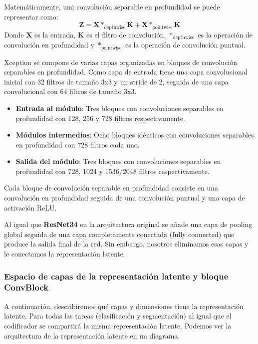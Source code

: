 Matemáticamente, una convolución separable en profundidad se puede representar como:
\[
\mathbf{Z} = \mathbf{X} *_{\text{depthwise}} \mathbf{K} + \mathbf{X} *_{\text{pointwise}} \mathbf{K}
\]
Donde \(\mathbf{X}\) es la entrada, \(\mathbf{K}\) es el filtro de convolución, \(*_{\text{depthwise}}\) es la operación de convolución en profundidad y \(*_{\text{pointwise}}\) es la operación de convolución puntual.


Xception se compone de varias capas organizadas en bloques de convolución separables en profundidad. Como capa de entrada tiene una capa convolucional inicial con 32 filtros de tamaño 3x3 y un stride de 2, seguida de una capa convolucional con 64 filtros de tamaño 3x3.

\begin{itemize}
	\item \textbf{Entrada al módulo}: Tres bloques con convoluciones separables en profundidad con 128, 256 y 728 filtros respectivamente.
	\item \textbf{Módulos intermedios}: Ocho bloques idénticos con convoluciones separables en profundidad con 728 filtros cada uno.
	\item \textbf{Salida del módulo}: Tres bloques con convoluciones separables en profundidad con 728, 1024 y 1536/2048 filtros respectivamente.
\end{itemize}

Cada bloque de convolución separable en profundidad consiste en una convolución en profundidad seguida de una convolución puntual y una capa de activación ReLU.

Al igual que \textbf{ResNet34} en la arquitectura original se añade una capa de pooling global seguida de una capa completamente conectada (fully connected) que produce la salida final de la red. Sin embargo, nosotros eliminamos esas capas y le conectamos la representación latente.

\subsubsection{Espacio de capas de la representación latente y bloque ConvBlock}

A continuación, describiremos qué capas y dimensiones tiene la representación latente. Para todas las tareas (clasificación y segmentación) al igual que el codificador se compartirá la misma representación latente. Podemos ver la arquitectura de la representación latente en un diagrama.

